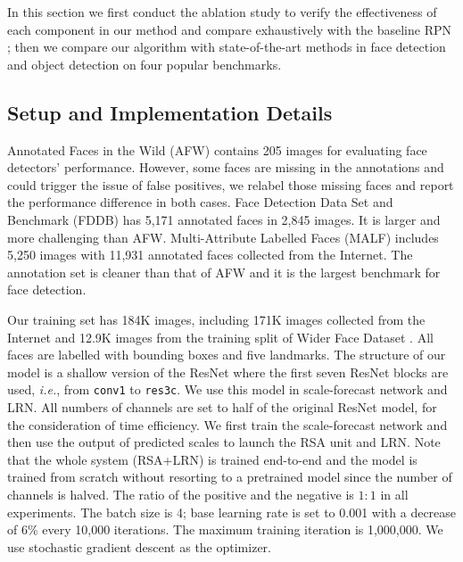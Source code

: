 \documentclass[10pt,twocolumn,letterpaper]{article}
\begin{document}
In this section we first conduct the ablation study to verify the effectiveness of each component in our method and compare exhaustively with the baseline RPN \cite{faster_rcnn}; then we compare our algorithm with state-of-the-art methods in face detection and object detection on four popular benchmarks.

\subsection{Setup and Implementation Details}
\label{sec:setup-and-implementation-details}
Annotated Faces in the Wild (AFW) \cite{Zhu2012Face} contains 205 images for evaluating face detectors' performance. 
However, some faces are missing in the annotations and could trigger the issue of false positives, we relabel those missing faces and report the performance difference in both cases.
%
Face Detection Data Set and Benchmark (FDDB) \cite{fddbTech} has 5,171 annotated faces in 2,845 images. It is larger and more challenging than AFW. 
%
Multi-Attribute Labelled Faces (MALF) \cite{faceevaluation15} includes 5,250 images with 11,931 annotated faces collected from the Internet. The annotation set is cleaner than that of AFW and it is the largest benchmark for face detection. 

Our training set has 184K images, including 171K images collected from the Internet and 12.9K images from the  training split of Wider Face Dataset \cite{yang2016wider}. All faces are labelled with bounding boxes and five landmarks. The structure of our model is a shallow version of the ResNet \cite{resNet} where the first seven ResNet blocks are used, \textit{i.e.}, from \texttt{conv1} to \texttt{res3c}. We use this model in scale-forecast network and LRN.
%
All numbers of channels are set to half of the original ResNet model, for the consideration of time efficiency. 
%
We first train the scale-forecast network and then use the output of predicted scales to launch the RSA unit and LRN. 
%
Note that the whole system (RSA+LRN) is trained end-to-end and the model is trained from scratch without resorting to a pretrained model since the number of channels is halved. 
The ratio of the positive and the negative is $1:1$ in all experiments. 
%
%
The batch size is 4; base learning rate is set to 0.001 with a decrease of 6\% every 10,000 iterations. The maximum training iteration is 1,000,000. We use stochastic gradient descent as the optimizer.
\end{document}
